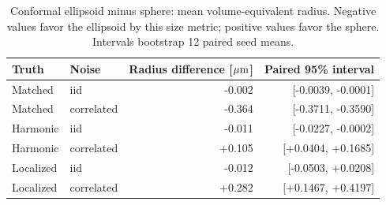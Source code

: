 \begin{table}[H]\centering\small
\begin{tabular}{llrr}\toprule
Truth & Noise & Radius difference [$\mu\mathrm{m}$] & Paired 95\% interval\\\midrule
Matched & iid & -0.002 & [-0.0039, -0.0001]\\
Matched & correlated & -0.364 & [-0.3711, -0.3590]\\
Harmonic & iid & -0.011 & [-0.0227, -0.0002]\\
Harmonic & correlated & +0.105 & [+0.0404, +0.1685]\\
Localized & iid & -0.012 & [-0.0503, +0.0208]\\
Localized & correlated & +0.282 & [+0.1467, +0.4197]\\
\bottomrule\end{tabular}
\caption{Conformal ellipsoid minus sphere: mean volume-equivalent radius. Negative values favor the ellipsoid by this size metric; positive values favor the sphere. Intervals bootstrap 12 paired seed means.}\label{tab:auditpaired}
\end{table}
